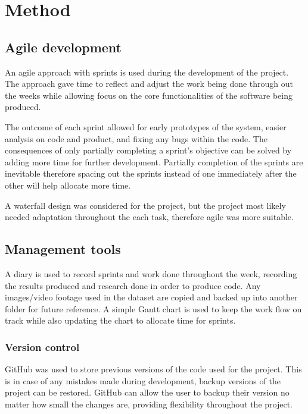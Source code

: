 \documentclass[12pt]{report}
\begin{document}
\chapter{Method}

\section{Agile development}

An agile approach with sprints is used during the development of the project. The approach gave time to reflect and adjust the work being done through out the weeks while allowing focus on the core functionalities of the software being produced. 

The outcome of each sprint allowed for early prototypes of the system, easier analysis on code and product, and fixing any bugs within the code. The consequences of only partially completing a sprint's objective can be solved by adding more time for further development. Partially completion of the sprints are inevitable therefore spacing out the sprints instead of one immediately after the other will help allocate more time. 

\vspace{2mm}

A waterfall design was considered for the project, but the project most likely needed adaptation throughout the each task, therefore agile was more suitable. 

\section{Management tools}

A diary is used to record sprints and work done throughout the week, recording the results produced and research done in order to produce code. Any images/video footage used in the dataset are copied and backed up into another folder for future reference. A simple Gantt chart is used to keep the work flow on track while also updating the chart to allocate time for sprints.

\subsection{Version control}

GitHub was used to store previous versions of the code used for the project. This is in case of any mistakes made during development, backup versions of the project can be restored. GitHub can allow the user to backup their version no matter how small the changes are, providing flexibility throughout the project. 
\end{document}
